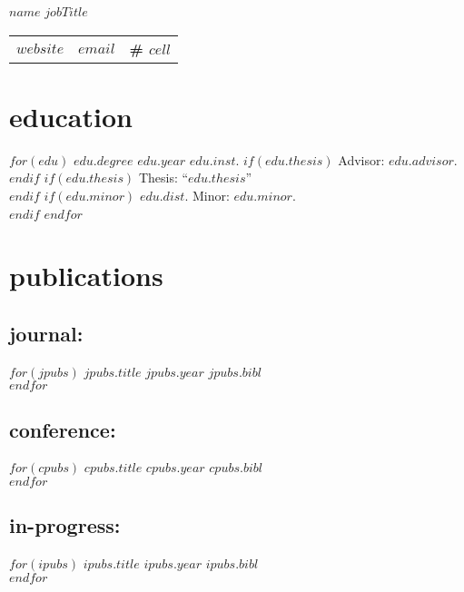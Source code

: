 \documentclass[]{friggeri-cv}
\begin{document}
\header
  {$name$}
  {$jobTitle$}



\vspace{-0.4in}
\hspace{0.35in}
\begin{tabular}{p{7.25cm}p{6cm}p{6cm}}
  \textbf{\href{$website$}{$website$}} &
  \textbf{\href{mailto:$email$}{$email$}} &
  \textbf{\# $cell$}
\end{tabular}



\section{education}
\begin{entrylist}
$for(edu)$
  \entrypub
  {$edu.degree$}
  {$edu.year$}
  {$edu.inst$.}
  $if(edu.thesis)$
    {Advisor: $edu.advisor$}.\\
  $endif$
  $if(edu.thesis)$
    {Thesis: ``$edu.thesis$''}\\
  $endif$
  $if(edu.minor)$
    {$edu.dist$. Minor: $edu.minor$}.\\
  $endif$
$endfor$
\end{entrylist}



\section{publications}

\subsection{journal:}
\begin{entrylist}
$for(jpubs)$
  \entrypub
  {$jpubs.title$}
  {$jpubs.year$}
  {$jpubs.bibl$}\\
$endfor$
\end{entrylist}

\subsection{conference:}
\begin{entrylist}
$for(cpubs)$
  \entrypub
  {$cpubs.title$}
  {$cpubs.year$}
  {$cpubs.bibl$}\\
$endfor$
\end{entrylist}

\subsection{in-progress:}
\begin{entrylist}
$for(ipubs)$
  \entrypub
  {$ipubs.title$}
  {$ipubs.year$}
  {$ipubs.bibl$}\\
$endfor$
\end{entrylist}
\end{document}
